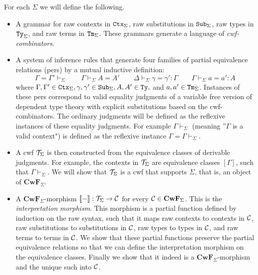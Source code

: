 \documentclass{lmcs}
\def\Cwf{\mathbf{CwF}}
\begin{document}
For each $\Sigma$ we will define the following.
\begin{itemize}
\item 
A grammar for raw contexts in ${\tt Ctx}_\Sigma$, raw substitutions in ${\tt Sub}_\Sigma$, raw types in ${\tt Ty}_\Sigma$, and raw terms in ${\tt Tm}_\Sigma$. These grammars generate a language of {\em cwf-combinators}.
\item
A system of inference rules that generate four families of partial equivalence relations (pers) by a mutual inductive definition:
$$
\Gamma = \Gamma' \vdash_\Sigma
\qquad
\Gamma \vdash_\Sigma A = A' 
\qquad
\Delta \vdash_\Sigma \gamma = \gamma' : \Gamma
\qquad
\Gamma \vdash_\Sigma a = a' : A
$$
where $\Gamma, \Gamma' \in {\tt Ctx}_\Sigma, \gamma, \gamma' \in {\tt Sub}_\Sigma, A, A' \in {\tt Ty},$ and $a,a' \in {\tt Tm}_\Sigma$. Instances of these pers correspond to valid equality judgments of a variable free version of dependent type theory with explicit substitutions based on the cwf-combinators. The ordinary judgments will be defined as the reflexive instances of these equality judgments. For example $\Gamma \vdash_\Sigma$ (meaning ”$\Gamma$ is a valid context") is defined as the reflexive instance $\Gamma = \Gamma \vdash_\Sigma$.
\item
A cwf ${\mathcal T}_\Sigma$ is then constructed from the equivalence classes of derivable judgments. For example, the contexts in ${\mathcal T}_\Sigma$ are equivalence classes $[\Gamma]$, such that $\Gamma \vdash_\Sigma$. We will show that ${\mathcal T}_\Sigma$ is a cwf that supports $\Sigma$, that is, an object of $\Cwf_\Sigma$.
\item
A $\Cwf_\Sigma$-morphism $\llbracket - \rrbracket : {\mathcal T}_\Sigma \to {\mathcal C}$ for every $\C \in \Cwf_\Sigma$. This is the {\em interpretation morphism}. This morphism is a partial function defined by induction on the raw syntax, such that it maps raw contexts to contexts in ${\mathcal C}$, raw substitutions to substitutions in ${\mathcal C}$, raw types to types in ${\mathcal C}$, and raw terms to terms in ${\mathcal C}$. We show that these partial functions preserve the partial equivalence relations so that we can define the interpretation morphism on the equivalence classes. Finally we show that it indeed is a $\Cwf_\Sigma$-morphism and the unique such into ${\mathcal C}$.
\end{itemize}
 
\end{document}
